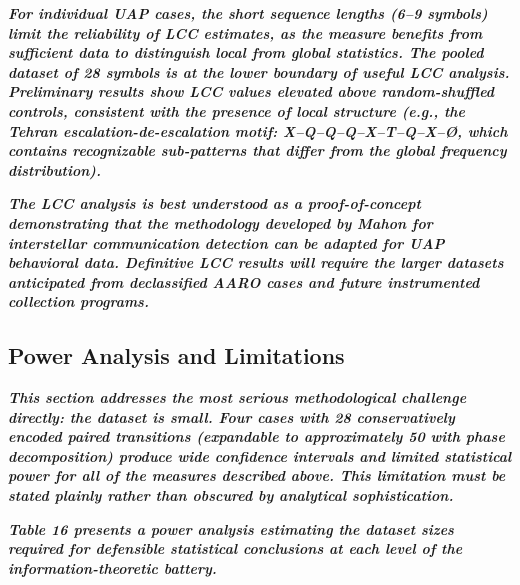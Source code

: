 \documentclass[11pt,letterpaper]{article}
\begin{document}
\textbf{\textit{For individual UAP cases, the short sequence lengths (6--9 symbols) limit the reliability of LCC estimates, as the measure benefits from sufficient data to distinguish local from global statistics. The pooled dataset of 28 symbols is at the lower boundary of useful LCC analysis. Preliminary results show LCC values elevated above random-shuffled controls, consistent with the presence of local structure (e.g., the Tehran escalation-de-escalation motif: X--Q--Q--Q--X--T--Q--X--{\O}, which contains recognizable sub-patterns that differ from the global frequency distribution).}}


\textbf{\textit{The LCC analysis is best understood as a proof-of-concept demonstrating that the methodology developed by Mahon for interstellar communication detection can be adapted for UAP behavioral data. Definitive LCC results will require the larger datasets anticipated from declassified AARO cases and future instrumented collection programs.}}


\subsection{Power Analysis and Limitations}

\textbf{\textit{This section addresses the most serious methodological challenge directly: the dataset is small. Four cases with 28 conservatively encoded paired transitions (expandable to approximately 50 with phase decomposition) produce wide confidence intervals and limited statistical power for all of the measures described above. This limitation must be stated plainly rather than obscured by analytical sophistication.}}


\textbf{\textit{Table 16 presents a power analysis estimating the dataset sizes required for defensible statistical conclusions at each level of the information-theoretic battery.}}
\end{document}
